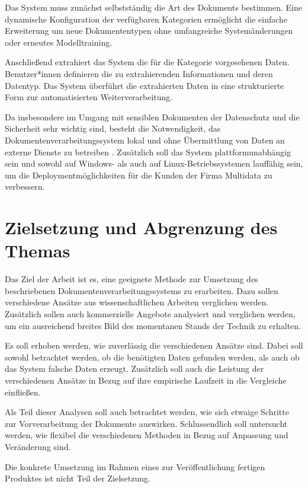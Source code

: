 Das System muss zunächst selbstständig die Art des Dokuments bestimmen. Eine dynamische Konfiguration der verfügbaren Kategorien ermöglicht die einfache Erweiterung um neue Dokumententypen ohne umfangreiche Systemänderungen oder erneutes Modelltraining.

Anschließend extrahiert das System die für die Kategorie vorgesehenen Daten. Benutzer*innen definieren die zu extrahierenden Informationen und deren Datentyp. Das System überführt die extrahierten Daten in eine strukturierte Form zur automatisierten Weiterverarbeitung.

Da insbesondere im Umgang mit sensiblen Dokumenten der Datenschutz und die Sicherheit sehr wichtig sind, besteht die Notwendigkeit, das Dokumentenverarbeitungssystem lokal und ohne Übermittlung von Daten an externe Dienste zu betreiben \parencite{HuangYupan2022LPfD}. Zusätzlich soll das System plattformunabhängig sein und sowohl auf Windows- als auch auf Linux-Betriebssystemen lauffähig sein, um die Deploymentmöglichkeiten für die Kunden der Firma Multidata zu verbessern.

\section{Zielsetzung und Abgrenzung des Themas}
\label{sec:zielsetzung-und-abgrenzung}

Das Ziel der Arbeit ist es, eine geeignete Methode zur Umsetzung des beschriebenen Dokumentenverarbeitungssystems zu erarbeiten. Dazu sollen verschiedene Ansätze aus wissenschaftlichen Arbeiten verglichen werden. Zusätzlich sollen auch kommerzielle Angebote analysiert und verglichen werden, um ein ausreichend breites Bild des momentanen Stands der Technik zu erhalten.

Es soll erhoben werden, wie zuverlässig die verschiedenen Ansätze sind. Dabei soll sowohl betrachtet werden, ob die benötigten Daten gefunden werden, als auch ob das System falsche Daten erzeugt. Zusätzlich soll auch die Leistung der verschiedenen Ansätze in Bezug auf ihre empirische Laufzeit in die Vergleiche einfließen.

Als Teil dieser Analysen soll auch betrachtet werden, wie sich etwaige Schritte zur Vorverarbeitung der Dokumente auswirken. Schlussendlich soll untersucht werden, wie flexibel die verschiedenen Methoden in Bezug auf Anpassung und Veränderung sind.

Die konkrete Umsetzung im Rahmen eines zur Veröffentlichung fertigen Produktes ist nicht Teil der Zielsetzung.

